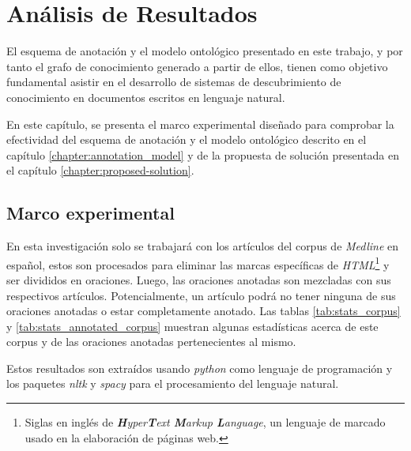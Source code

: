 \chapter{Análisis de Resultados}\label{chapter:analysis-of-results}
El esquema de anotación y el modelo ontológico presentado en este trabajo, y por tanto el grafo de conocimiento generado a partir de ellos, tienen como objetivo fundamental asistir en el desarrollo de sistemas de descubrimiento de conocimiento en documentos escritos en lenguaje natural.

En este capítulo, se presenta el marco experimental diseñado para comprobar la efectividad del esquema de anotación y el modelo ontológico descrito en el capítulo \ref{chapter:annotation_model} y de la propuesta de solución presentada en el capítulo \ref{chapter:proposed-solution}.

\section{Marco experimental}
En esta investigación solo se trabajará con los artículos del corpus de \textit{Medline} en español, estos son procesados para eliminar las marcas específicas de \textit{HTML}\footnote{Siglas en inglés de \textit{\textbf{H}yper\textbf{T}ext \textbf{M}arkup \textbf{L}anguage}, un lenguaje de marcado usado en la elaboración de páginas web.} y ser divididos en oraciones. Luego, las oraciones anotadas son mezcladas con sus respectivos artículos. Potencialmente, un artículo podrá no tener ninguna de sus oraciones anotadas o estar completamente anotado. Las tablas \ref{tab:stats_corpus} y \ref{tab:stats_annotated_corpus} muestran algunas estadísticas acerca de este corpus y de las oraciones anotadas pertenecientes al mismo.

Estos resultados son extraídos usando \textit{python} como lenguaje de programación y los paquetes \textit{nltk} y \textit{spacy} para el procesamiento del lenguaje natural.

